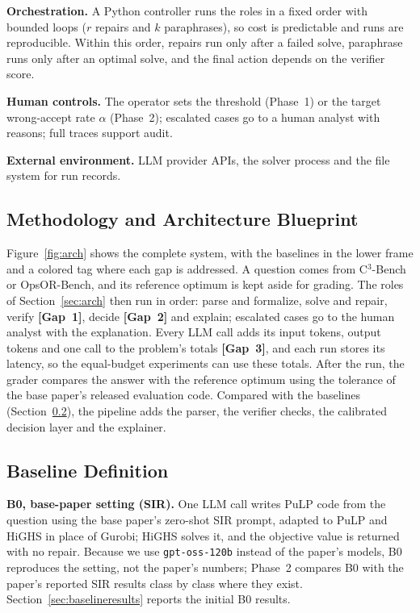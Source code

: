 \documentclass[11pt,a4paper]{article}
\newcommand{\gaptag}[2]{\textcolor{#1}{\textbf{[#2]}}}
\newcommand{\cthree}{C$^3$-Bench}
\begin{document}
\textbf{Orchestration.} A Python controller runs the roles in a fixed order with bounded loops ($r$ repairs and $k$ paraphrases), so cost is predictable and runs are reproducible. Within this order, repairs run only after a failed solve, paraphrase runs only after an optimal solve, and the final action depends on the verifier score.

\textbf{Human controls.} The operator sets the threshold (Phase~1) or the target wrong-accept rate $\alpha$ (Phase~2); escalated cases go to a human analyst with reasons; full traces support audit.

\textbf{External environment.} LLM provider APIs, the solver process and the file system for run records.

\subsection{Methodology and Architecture Blueprint}
\label{sec:blueprint}

Figure~\ref{fig:arch} shows the complete system, with the baselines in the lower frame and a colored tag where each gap is addressed. A question comes from \cthree{} or OpsOR-Bench, and its reference optimum is kept aside for grading. The roles of Section~\ref{sec:arch} then run in order: parse and formalize, solve and repair, verify \gaptag{gapone}{Gap~1}, decide \gaptag{gaptwo}{Gap~2} and explain; escalated cases go to the human analyst with the explanation. Every LLM call adds its input tokens, output tokens and one call to the problem's totals \gaptag{gapthree}{Gap~3}, and each run stores its latency, so the equal-budget experiments can use these totals. After the run, the grader compares the answer with the reference optimum using the tolerance of the base paper's released evaluation code. Compared with the baselines (Section~\ref{sec:baseline}), the pipeline adds the parser, the verifier checks, the calibrated decision layer and the explainer.

\subsection{Baseline Definition}
\label{sec:baseline}

\textbf{B0, base-paper setting (SIR).} One LLM call writes PuLP code from the question using the base paper's zero-shot SIR prompt, adapted to PuLP and HiGHS in place of Gurobi; HiGHS solves it, and the objective value is returned with no repair. Because we use \texttt{gpt-oss-120b} instead of the paper's models, B0 reproduces the setting, not the paper's numbers; Phase~2 compares B0 with the paper's reported SIR results class by class where they exist. Section~\ref{sec:baselineresults} reports the initial B0 results.
\end{document}
